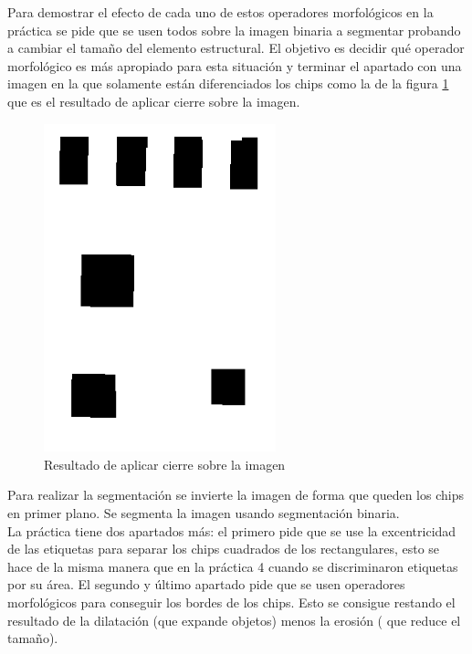 \documentclass[a4paper,12pt]{report}
\begin{document}
Para demostrar el efecto de cada uno de estos operadores morfológicos en la práctica se pide que se usen todos sobre la imagen binaria a segmentar probando a cambiar el tamaño del elemento estructural. El objetivo es decidir qué operador morfológico es más apropiado para esta situación y terminar el apartado con una imagen en la que solamente están diferenciados los chips como la de la figura \ref{closing} que es el resultado de aplicar cierre sobre la imagen.\\

\begin{figure}[h]
\centering
\includegraphics[width=0.6\textwidth]{imagenes/Closing}
\caption{Resultado de aplicar cierre sobre la imagen}
\label{closing} 
\end{figure}

Para realizar la segmentación se invierte la imagen de forma que queden los chips en primer plano. Se segmenta la imagen usando segmentación binaria.\\

La práctica tiene dos apartados más: el primero pide que se use la excentricidad de las etiquetas para separar los chips cuadrados de los rectangulares, esto se hace de la misma manera que en la práctica 4 cuando se discriminaron etiquetas por su área. El segundo y último apartado pide que se usen operadores morfológicos para conseguir los bordes de los chips. Esto se consigue restando el resultado de la dilatación (que expande objetos) menos la erosión ( que reduce el tamaño).\\
\end{document}
